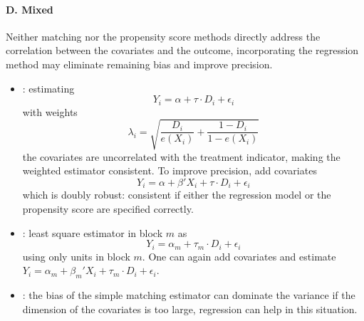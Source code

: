 \documentclass[twoside]{article}
\begin{document}
\paragraph*{D. Mixed} Neither matching nor the propensity score methods directly address the correlation between the covariates and the outcome, incorporating the regression method may eliminate remaining bias and improve precision.

\begin{itemize}
    \item {}: estimating $$ Y_i = \alpha + \tau\cdot D_i + \epsilon_i $$ with weights $$ \lambda_i = \sqrt{ \frac{D_i}{e(X_i)} + \frac{1-D_i}{1-e(X_i)} } $$
    the covariates are uncorrelated with the treatment indicator, making the weighted estimator consistent. To improve precision, add covariates 
    $$ Y_i = \alpha + \beta'X_i + \tau\cdot D_i + \epsilon_i $$
    which is doubly robust: consistent if either the regression model or the propensity score are specified correctly.
    \item {}: least square estimator in block $m$ as $$ Y_i = \alpha_m + \tau_m\cdot D_i + \epsilon_i $$ using only units in block $m$. One can again add covariates and estimate $Y_i = \alpha_m + \beta_m' X_i + \tau_m\cdot D_i + \epsilon_i$.
    \item {}: the bias of the simple matching estimator can dominate the variance if the dimension of the covariates is too large, regression can help in this situation.
    

\end{itemize}
\end{document}
